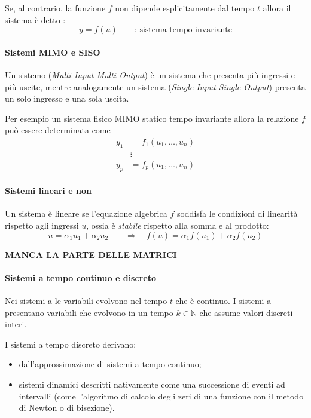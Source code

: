  	Se, al contrario, la funzione $f$ non dipende esplicitamente dal tempo $t$ allora il sistema è detto :
 	\[ y = f(u) \qquad \textrm{: sistema tempo invariante} \]
 	
 	\paragraph{Sistemi MIMO e SISO} Un sistemo  (\textit{Multi Input Multi Output}) è un sistema che presenta più ingressi e più uscite, mentre analogamente un sistema  (\textit{Single Input Single Output}) presenta un solo ingresso e una sola uscita.
 	
 	Per esempio un sistema fisico MIMO statico tempo invariante allora la relazione $f$ può essere determinata come
 	\begin{align*}
 	y_1 & = f_1 (u_1,\dots, u_n) \\ & \vdots \\ 
 	y_p & = f_p (u_1,\dots, u_n) 
 	\end{align*}
 	
 	
 	\paragraph{Sistemi lineari e non} Un sistema è lineare se l'equazione algebrica $f$ soddisfa le condizioni di linearità rispetto agli ingressi $u$, ossia è \textit{stabile} rispetto alla somma e al prodotto:
 	\[ u = \alpha_1 u_1 + \alpha_2 u_2 \qquad \Rightarrow \quad f(u) = \alpha_1 f(u_1) + \alpha_2 f(u_2) \]
 	
 	\textbf{MANCA LA PARTE DELLE MATRICI}
 	
 	\paragraph{Sistemi a tempo continuo e discreto} Nei sistemi a  le variabili evolvono nel tempo $t$ che è continuo. I sistemi a  presentano variabili che evolvono in un tempo $k \in \mathds N$ che assume valori discreti interi.
 	
 	I sistemi a tempo discreto derivano:
 	\begin{itemize}
 		\item dall'approssimazione di sistemi a tempo continuo;
 		\item sistemi dinamici descritti nativamente come una successione di eventi ad intervalli (come l'algoritmo di calcolo degli zeri di una funzione con il metodo di Newton o di bisezione).
 	\end{itemize}
 	
